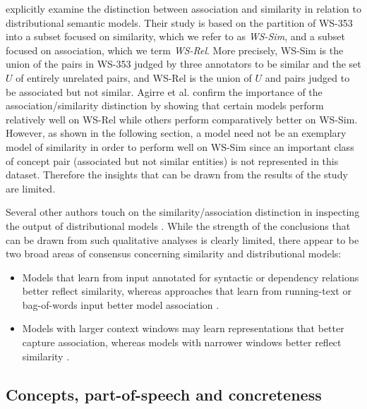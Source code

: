 \cite{agirre2009study} explicitly examine the distinction between association and similarity in relation to distributional semantic models. Their study is based on the partition of WS-353 into a subset focused on similarity, which we refer to as \emph{WS-Sim}, and a subset focused on association, which we term \emph{WS-Rel}. More precisely, WS-Sim is the union of the pairs in WS-353 judged by three annotators to be similar and the set \(U\) of entirely unrelated pairs, and WS-Rel is the union of \(U\) and pairs judged to be associated but not similar. Agirre et al. confirm the importance of the association/similarity distinction by showing that certain models perform relatively well on WS-Rel while others perform comparatively better on WS-Sim. However, as shown in the following section, a model need not be an exemplary model of similarity in order to perform well on WS-Sim since an important class of concept pair (associated but not similar entities) is not represented in this dataset. Therefore the insights that can be drawn from the results of the \cite{agirre2009study} study are limited.  

Several other authors touch on the similarity/association distinction in inspecting the output of distributional models \cite{andrews2009integrating,kiela2014systematic,levy2014dependency}. While the strength of the conclusions that can be drawn from such qualitative analyses is clearly limited, there appear to be two broad areas of consensus concerning similarity and distributional models: 

\begin{itemize}

\item Models that learn from input annotated for syntactic or dependency relations better reflect similarity, whereas approaches that learn from running-text or bag-of-words input better model association \cite{agirre2009study,levy2014dependency}. 

\item Models with larger context windows may learn representations that better capture association, whereas models with narrower windows better reflect similarity \cite{agirre2009study,kiela2014systematic}.

\end{itemize}







\subsection{Concepts, part-of-speech and concreteness}



